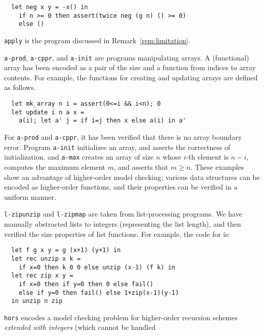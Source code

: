 \begin{asparaitem}
\begin{verbatim}
  let neg x y = -x() in
    if n >= 0 then assert(twice neg (g n) () >= 0)
    else ()
\end{verbatim}
\item \texttt{apply} is the program discussed in 
Remark~\ref{rem:limitation}.
\item \texttt{a-prod}, \texttt{a-cppr}, and \texttt{a-init} are programs 
manipulating arrays. A (functional) array has been encoded as a pair of 
the size and a function from indices to array contents. For example, the 
functions for creating and updating arrays are defined as follows.
\begin{verbatim}
  let mk_array n i = assert(0<=i && i<n); 0
  let update i n a x =
    a(i); let a' j = if i=j then x else a(i) in a'
\end{verbatim}
For \texttt{a-prod} and \texttt{a-cppr}, it has been verified that there 
is no array boundary error. Program \texttt{a-init} initializes an array, 
and asserts the correctness of initialization. and \texttt{a-max} 
creates an array of size \(n\) whose \(i\)-th element is \(n-i\), 
computes the maximum element \(m\), and asserts that \(m\geq n\).
These examples show an advantage of higher-order model checking; various 
data structures can be encoded as higher-order functions, and their 
properties can be verified in a uniform manner.
\item \texttt{l-zipunzip} and \texttt{l-zipmap} are taken from 
list-processing programs. We have manually abstracted lists to integers 
(representing the list length), and then verified the size properties of 
list functions. For example, the code for  is:
\begin{verbatim}
  let f g x y = g (x+1) (y+1) in
  let rec unzip x k = 
    if x=0 then k 0 0 else unzip (x-1) (f k) in
  let rec zip x y =
    if x=0 then if y=0 then 0 else fail()
    else if y=0 then fail() else 1+zip(x-1)(y-1)
  in unzip n zip
\end{verbatim}
\item \texttt{hors} encodes a model checking problem for higher-order 
recursion schemes \emph{extended with integers} (which cannot be handled 

\end{asparaitem}
